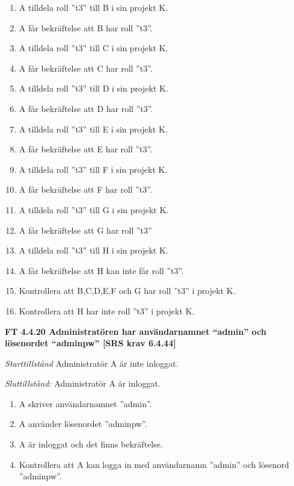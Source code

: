 \documentclass[a4paper]{article}
\begin{document}
\begin{enumerate}
\item A tilldela roll ”t3” till B i sin projekt K. 
\item A får bekräftelse att B har roll ”t3”.
\item A tilldela roll ”t3” till C i sin projekt K. 
\item A får bekräftelse att C har roll ”t3”.
\item A tilldela roll ”t3” till D i sin projekt K. 
\item A får bekräftelse att D har roll ”t3”.
\item A tilldela roll ”t3” till E i sin projekt K. 
\item A får bekräftelse att E har roll ”t3”.
\item A tilldela roll ”t3” till F i sin projekt K.
\item A får bekräftelse att F har roll ”t3”.
\item A tilldela roll ”t3” till G i sin projekt K. 
\item A får bekräftelse att G har roll ”t3”
\item A tilldela roll ”t3” till H i sin projekt K. 
\item A får bekräftelse att H kan inte får roll ”t3”.
\item Kontrollera att B,C,D,E,F och G har roll ”t3” i projekt K.
\item Kontrollera att H har inte roll ”t3” i projekt K.
\end{enumerate}

\textbf{FT 4.4.20 Administratören har användarnamnet “admin” och lösenordet “adminpw” [SRS krav 6.4.44]}

\emph{Starttillstånd} Administratör A är inte inloggat.

\emph{Sluttillstånd:} Administratör A är inloggat.

\begin{enumerate}
\item A skriver användarnamnet ”admin”.
\item A använder lösenordet ”adminpw”.
\item A är inloggat och det finns bekräftelse.
\item Kontrollera att A kan logga in med användarnamn ”admin” och lösenord ”adminpw”.
\end{enumerate}

\end{document}
